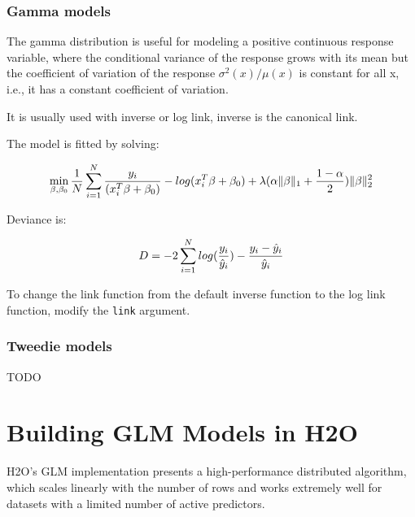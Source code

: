

\subsubsection{Gamma models}
The gamma distribution is useful for modeling a positive continuous response variable, where the conditional
variance of the response grows with its mean but the coefficient of variation of the response $\sigma^2(x)/μ(x)$ is
constant for all x, i.e., it has a constant coefficient of variation.

It is usually used with inverse or log link, inverse is the canonical link.

The model is fitted by solving:

\[  \min\limits_{\beta,\beta_0} { {1 \over N}\sum\limits_{i=1}\limits^{N}{y_i \over (x_i^{T}\beta  + \beta_0)} - log({x_i^{T}\beta  + \beta_0})  + \lambda (\alpha \|\beta \|_1 + {1-\alpha \over 2}) \| \beta \|_2^2} \]

Deviance is:

\[D = -2\sum\limits_{i=1}\limits^{N}{log({y_i \over \hat{y}_i}) - {y_i - \hat{y}_i \over\hat{y}_i }}\]

\waterExampleInR

To change the link function from the default inverse function to the log link function, modify the \texttt{link}
argument.



\subsubsection{Tweedie models}

TODO




\section{Building GLM Models in H2O}

H2O's GLM implementation presents a high-performance distributed algorithm, which scales linearly with the number
of rows and works extremely well for datasets with a limited number of active predictors.

